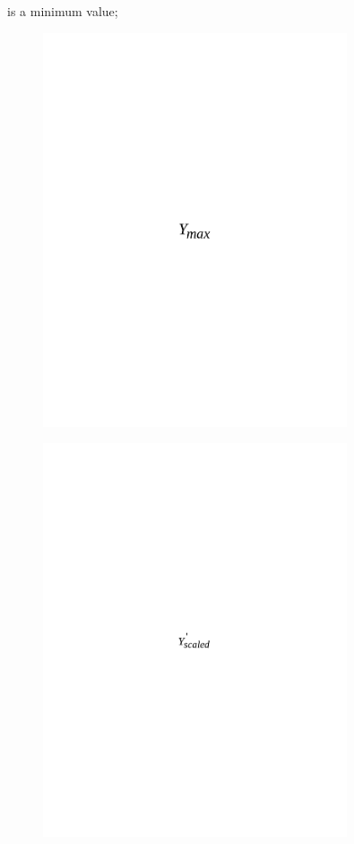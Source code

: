 is a minimum value;
\begin{figure}[H]
	\centering
	\includegraphics[width=0.8\textwidth]{media/ict/image31}
	\caption*{}
\end{figure}

\begin{figure}[H]
	\centering
	\includegraphics[width=0.8\textwidth]{media/ict/image32}
	\caption*{}
\end{figure}

